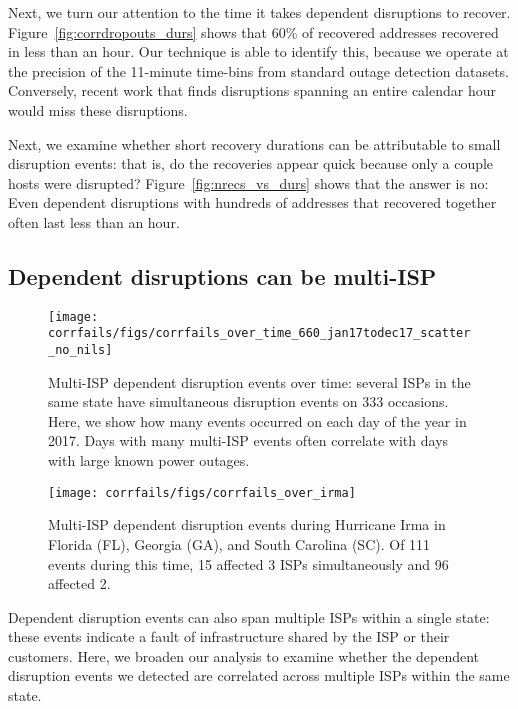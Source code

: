 Next, we turn our attention to the time it takes dependent disruptions
to recover.
%
Figure~\ref{fig:corrdropouts_durs} shows that 60\% of recovered
addresses recovered in less than an hour.
%
Our technique is able to identify this, because we operate at the
precision of the 11-minute time-bins from standard outage detection
datasets.
%
Conversely, recent work that finds disruptions spanning an entire
calendar hour~\cite{advancing-outage-art} would miss these disruptions.


Next, we examine whether short recovery durations can be attributable
to small disruption events: that is, do the recoveries appear quick
because only a couple hosts were disrupted?
%
Figure~\ref{fig:nrecs_vs_durs} shows that the answer is no: Even
dependent disruptions with hundreds of addresses that recovered
together often last less than an hour.

\subsection{Dependent disruptions can be multi-ISP}

\begin{figure}[t]
\centering
\texttt{[image: corrfails/figs/corrfails\_over\_time\_660\_jan17todec17\_scatter\_no\_nils]}
\caption[Multi-ISP dependent disruption events over time]{
\label{fig:multiisp_over_time}
Multi-ISP dependent disruption events over time: several ISPs in the same
state have simultaneous disruption events on 333 occasions. Here, we
show how many events occurred on each day of the year in 2017. Days
with many multi-ISP events often correlate with days with large known power outages.}
\end{figure}

\begin{figure}[t]
\centering
\texttt{[image: corrfails/figs/corrfails\_over\_irma]}
\caption[Multi-ISP dependent disruption events during Hurricane Irma]{
\label{fig:corrfails_over_irma}
Multi-ISP dependent disruption events during Hurricane Irma in Florida (FL), Georgia (GA),
and South Carolina (SC). Of 111 events during this time, 15 affected 3
ISPs simultaneously and 96 affected 2.}
\end{figure}

Dependent disruption events can also span multiple ISPs within a
single state: these events indicate a fault of infrastructure shared
by the ISP or their customers. 
%
Here, we broaden our analysis to examine whether the dependent
disruption events we detected are
correlated across multiple ISPs within the same state.

